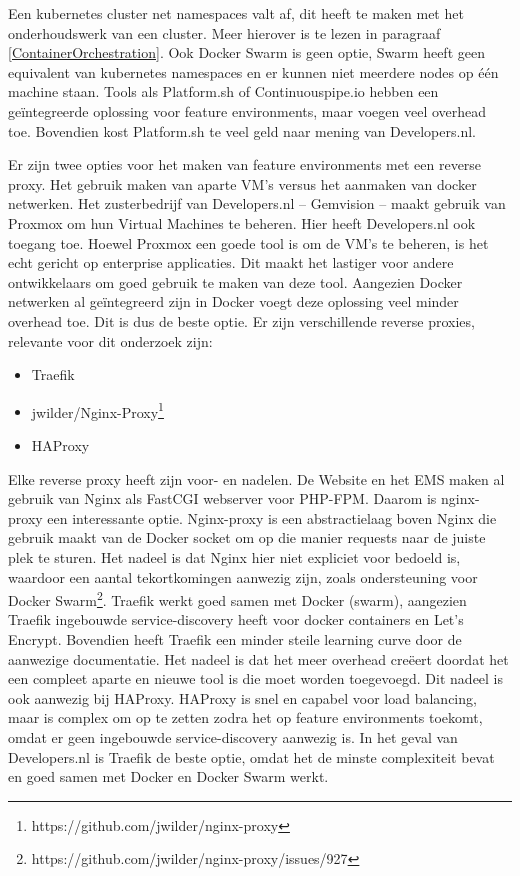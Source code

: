 Een kubernetes cluster net namespaces valt af, dit heeft te maken met het onderhoudswerk van een cluster. Meer hierover is te lezen in paragraaf \ref{ContainerOrchestration}. Ook Docker Swarm is geen optie, Swarm heeft geen equivalent van kubernetes namespaces en er kunnen niet meerdere nodes op één machine staan. Tools als Platform.sh of Continuouspipe.io hebben een geïntegreerde oplossing voor feature environments, maar voegen veel overhead toe. Bovendien kost Platform.sh te veel geld naar mening van Developers.nl.

Er zijn twee opties voor het maken van feature environments met een reverse proxy. Het gebruik maken van aparte VM's versus het aanmaken van docker netwerken. Het zusterbedrijf van Developers.nl -- Gemvision -- maakt gebruik van Proxmox om hun Virtual Machines te beheren. Hier heeft Developers.nl ook toegang toe. Hoewel Proxmox een goede tool is om de VM's te beheren, is het echt gericht op enterprise applicaties. Dit maakt het lastiger voor andere ontwikkelaars om goed gebruik te maken van deze tool. Aangezien Docker netwerken al geïntegreerd zijn in Docker voegt deze oplossing veel minder overhead toe. Dit is dus de beste optie. Er zijn verschillende reverse proxies, relevante voor dit onderzoek zijn:
\begin{itemize}
	\item Traefik
	\item jwilder/Nginx-Proxy\footnote{https://github.com/jwilder/nginx-proxy}
	\item HAProxy	
\end{itemize}

Elke reverse proxy heeft zijn voor- en nadelen. De Website en het EMS maken al gebruik van Nginx als FastCGI webserver voor PHP-FPM. Daarom is nginx-proxy een interessante optie. Nginx-proxy is een abstractielaag boven Nginx die gebruik maakt van de Docker socket om op die manier requests naar de juiste plek te sturen. Het nadeel is dat Nginx hier niet expliciet voor bedoeld is, waardoor een aantal tekortkomingen aanwezig zijn, zoals ondersteuning voor Docker Swarm\footnote{https://github.com/jwilder/nginx-proxy/issues/927}. Traefik werkt goed samen met Docker (swarm), aangezien Traefik ingebouwde service-discovery heeft voor docker containers en Let's Encrypt. Bovendien heeft Traefik een minder steile learning curve door de aanwezige documentatie. Het nadeel is dat het meer overhead creëert doordat het een compleet aparte en nieuwe tool is die moet worden toegevoegd. Dit nadeel is ook aanwezig bij HAProxy. HAProxy is snel en capabel voor load balancing, maar is complex om op te zetten zodra het op feature environments toekomt, omdat er geen ingebouwde service-discovery aanwezig is.  In het geval van Developers.nl is Traefik de beste optie, omdat het de minste complexiteit bevat en goed samen met Docker en Docker Swarm werkt. 

